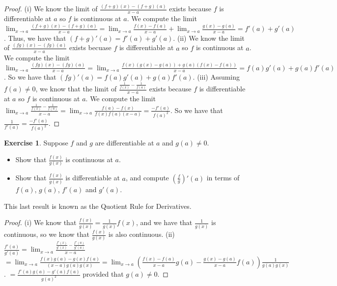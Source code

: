 \documentclass[12pt]{article}
\renewcommand{\_}[1]{\underline{ #1 }}
\theoremstyle{definition}
\newtheorem{exercise}[theorem]{Exercise}
\numberwithin{equation}{subsection}
\begin{document}
\begin{proof}
(i) We know the limit of $\frac{(f+g)(x)-(f+g)(a)}{x-a}$ exists because $f$ is differentiable at $a$ so $f$ is continuous at $a$. We compute the limit $\lim_{x \to a} \frac{(f+g)(x)-(f+g)(a)}{x-a} = \lim_{x \to a} \frac{f(x)-f(a)}{x-a} + \lim_{x \to a} \frac{g(x)-g(a)}{x-a} = f'(a) + g'(a)$. Thus, we have that $(f+g)'(a) = f'(a) + g'(a)$. \newline
(ii) We know the limit of $\frac{(fg)(x)-(fg)(a)}{x-a}$ exists becuase $f$ is differentiable at $a$ so $f$ is continuous at $a$. We compute the limit $\lim_{x \to a} \frac{(fg)(x)-(fg)(a)}{x-a} = \lim_{x \to a} \frac{f(x)(g(x)-g(a)) + g(a)(f(x) - f(a))}{x - a} = f(a)g'(a) + g(a)f'(a)$. So we have that $(fg)'(a) = f(a)g'(a) + g(a)f'(a)$. \newline
(iii) Assuming $f(a) \not = 0$, we know that the limit of $\frac{\frac{1}{f(x)} - \frac{1}{f(a)}}{x - a}$ exists because $f$ is differentiable at $a$ so $f$ is continuous at $a$. We compute the limit $\lim_{x \to a} \frac{\frac{1}{f(x)} - \frac{1}{f(a)}}{x - a} = \lim_{x \to a} \frac{f(a) - f(x)}{f(x)f(a)(x-a)} = \frac{-f'(a)}{f(a)^2}$. So we have that $\frac{1}{f'(a)} = \frac{-f'(a)}{f(a)^2}$.
\end{proof}

\begin{exercise} 
Suppose $f$ and $g$ are differentiable at $a$ and $g(a)\neq 0$.
\begin{itemize}
\item[(i)]
Show that $\frac{f(x)}{g(x)}$ is continuous at $a$.

\item[(ii)]
Show that $\frac{f(x)}{g(x)}$ is differentiable at $a$, and compute $\left(\frac{f}{g}\right)'(a)$ in 
terms of  $f(a)$, $g(a)$, $f'(a)$ and $g'(a)$.
\end{itemize}
This last result is known as the Quotient Rule for Derivatives.
\end{exercise}

\begin{proof}
(i) We know that $\frac{f(x)}{g(x)} = \frac{1}{g(x)} f(x)$, and we have that $\frac{1}{g(x)}$ is continuous, so we know that $\frac{f(x)}{g(x)}$ is also continuous. \newline
(ii) $\frac{f'(a)}{g'(a)} = \lim_{x \to a} \frac{\frac{f'(x)}{g'(x)} - \frac{f'(a)}{g'(a)}}{x - a}$ \newline
$= \lim_{x \to a} \frac{f(x)g(a) - g(x)f(a)}{(x-a)g(a)g(x)} = \lim_{x \to a}(\frac{f(x)-f(a)}{x-a}g(a) - \frac{g(x) - g(a)}{x - a}f(a)) \frac{1}{g(a)g(x)}$. \newline
$= \frac{f'(a)g(a) - g'(a)f(a)}{g(a)^2}$ provided that $g(a) \not = 0$.
\end{proof}
\end{document}

